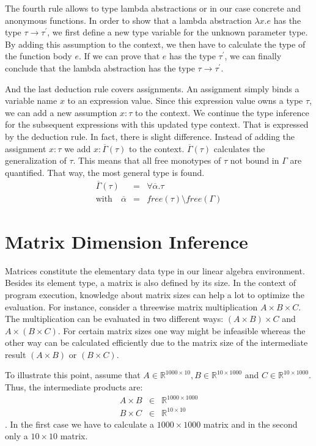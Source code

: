 The fourth rule allows to type lambda abstractions or in our case concrete and anonymous functions.
In order to show that a lambda abstraction $\lambda x.e$ has the type $\tau\rightarrow \tau^\prime$, we first define a new type variable for the unknown parameter type.
By adding this assumption to the context, we then have to calculate the type of the function body $e$.
If we can prove that $e$ has the type $\tau^\prime$, we can finally conclude that the lambda abstraction has the type $\tau \rightarrow \tau^\prime$.

And the last deduction rule covers assignments.
An assignment simply binds a variable name $x$ to an expression value.
Since this expression value owns a type $\tau$, we can add a new assumption $x:\tau$ to the context.
We continue the type inference for the subsequent expressions with this updated type context.
That is expressed by the deduction rule.
In fact, there is slight difference.
Instead of adding the assignment $x:\tau$ we add $x:\overline{\Gamma}(\tau)$ to the context.
$\overline{\Gamma}(\tau)$ calculates the generalization of $\tau$.
This means that all free monotypes of $\tau$ not bound in $\Gamma$ are quantified.
That way, the most general type is found.
\begin{eqnarray*}
	\overline{\Gamma}(\tau) &=& \forall \overline{\alpha}. \tau\\
	\text{with}\quad\overline{\alpha} &=& free(\tau) \setminus free(\Gamma)
\end{eqnarray*}

\section{Matrix Dimension Inference}
\label{sec:MatrixDimensionInference}

Matrices constitute the elementary data type in our linear algebra environment.
Besides its element type, a matrix is also defined by its size.
In the context of program execution, knowledge about matrix sizes can help a lot to optimize the evaluation.
For instance, consider a threewise matrix multiplication $A\times B\times C$.
The multiplication can be evaluated in two different ways: $(A\times B)\times C$ and $A\times(B\times C)$.
For certain matrix sizes one way might be infeasible whereas the other way can be calculated efficiently due to the matrix size of the intermediate result $(A\times B)$ or $(B\times C)$.

To illustrate this point, assume that $A\in \mathbb{R}^{1000\times 10}, B\in \mathbb{R}^{10\times 1000}$ and $C \in \mathbb{R}^{10\times 1000}$.
Thus, the intermediate products are:
\begin{eqnarray*}
	A\times B &\in& \mathbb{R}^{1000 \times 1000}\\
	B\times C &\in& \mathbb{R}^{10 \times 10}
\end{eqnarray*}
.
In the first case we have to calculate a $1000 \times 1000$ matrix and in the second only a $10 \times 10$ matrix.

